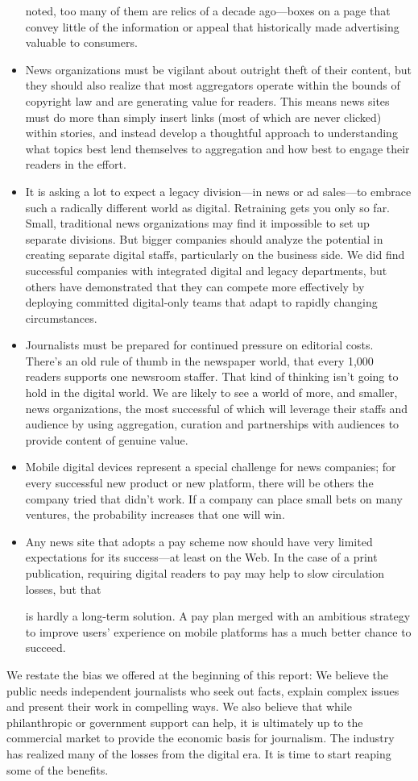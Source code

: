 \begin{itemize}
noted, too many of them are relics of a decade ago—boxes on a page that
convey little of the information or appeal that historically made advertising
valuable to consumers.
\item News organizations must be vigilant about outright theft of their content,
but they should also realize that most aggregators operate within the bounds
of copyright law and are generating value for readers. This means news sites
must do more than simply insert links (most of which are never clicked)
within stories, and instead develop a thoughtful approach to understanding
what topics best lend themselves to aggregation and how best to engage
their readers in the effort.
\item It is asking a lot to expect a legacy division—in news or ad sales—to embrace
such a radically different world as digital. Retraining gets you only so
far. Small, traditional news organizations may find it impossible to set up separate
divisions. But bigger companies should analyze the potential in creating
separate digital staffs, particularly on the business side. We did find successful
companies with integrated digital and legacy departments, but others have
demonstrated that they can compete more effectively by deploying committed
digital-only teams that adapt to rapidly changing circumstances.
\item Journalists must be prepared for continued pressure on editorial costs. There's
an old rule of thumb in the newspaper world, that every 1,000 readers supports
one newsroom staffer. That kind of thinking isn't going to hold in the
digital world. We are likely to see a world of more, and smaller, news organizations,
the most successful of which will leverage their staffs and audience
by using aggregation, curation and partnerships with audiences to provide
content of genuine value.
\item Mobile digital devices represent a special challenge for news companies; for
every successful new product or new platform, there will be others the company
tried that didn't work. If a company can place small bets on many ventures,
the probability increases that one will win.
\item Any news site that adopts a pay scheme now should have very limited expectations
for its success—at least on the Web. In the case of a print publication,
requiring digital readers to pay may help to slow circulation losses, but that

is hardly a long-term solution. A pay plan merged with an ambitious strategy
to improve users' experience on mobile platforms has a much better chance
to succeed.
\end{itemize}
We restate the bias we offered at the beginning of this report: We believe
the public needs independent journalists who seek out facts, explain complex
issues and present their work in compelling ways. We also believe that while
philanthropic or government support can help, it is ultimately up to the commercial
market to provide the economic basis for journalism. The industry has
realized many of the losses from the digital era. It is time to start reaping some
of the benefits.

